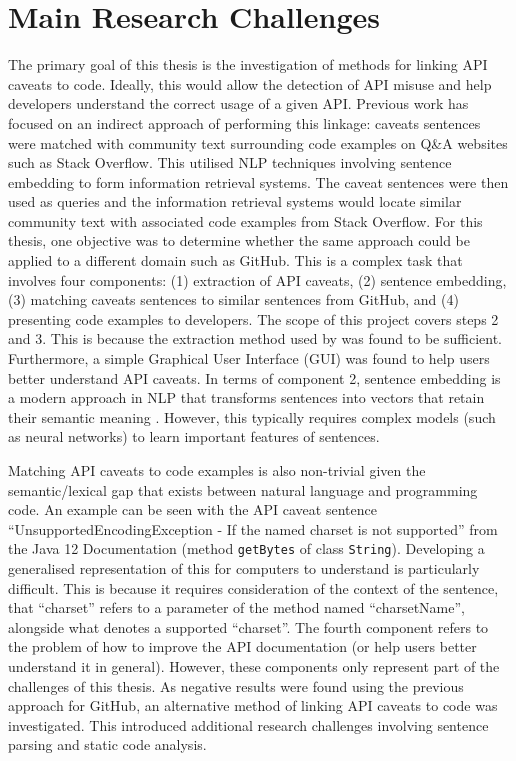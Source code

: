 \section{Main Research Challenges}
\label{sec:mainresearchchallenges}
The primary goal of this thesis is the investigation of methods for linking API caveats to code. Ideally, this would allow the detection of API misuse and help developers understand the correct usage of a given API. Previous work has focused on an indirect approach of performing this linkage: caveats sentences were matched with community text surrounding code examples on Q\&A websites such as Stack Overflow. This utilised NLP techniques involving sentence embedding to form information retrieval systems. The caveat sentences were then used as queries and the information retrieval systems would locate similar community text with associated code examples from Stack Overflow. For this thesis, one objective was to determine whether the same approach could be applied to a different domain such as GitHub. This is a complex task that involves four components: (1) extraction of API caveats, (2) sentence embedding, (3) matching caveats sentences to similar sentences from GitHub, and (4) presenting code examples to developers. The scope of this project covers steps 2 and 3. This is because the extraction method used by \cite{jiamou} was found to be sufficient. Furthermore, a simple Graphical User Interface (GUI) was found to help users better understand API caveats. In terms of component 2, sentence embedding is a modern approach in NLP that transforms sentences into vectors that retain their semantic meaning \cite{palangi2016deep}. However, this typically requires complex models (such as neural networks) to learn important features of sentences. \bigbreak

Matching API caveats to code examples is also non-trivial given the semantic/lexical gap that exists between natural language and programming code. An example can be seen with the API caveat sentence ``UnsupportedEncodingException - If the named charset is not supported'' from the Java 12 Documentation (method \lstinline{getBytes} of class \lstinline{String}). Developing a generalised representation of this for computers to understand is particularly difficult. This is because it requires consideration of the context of the sentence, that ``charset'' refers to a parameter of the method named ``charsetName'', alongside what denotes a supported ``charset''. The fourth component refers to the problem of how to improve the API documentation (or help users better understand it in general). However, these components only represent part of the challenges of this thesis. As negative results were found using the previous approach for GitHub, an alternative method of linking API caveats to code was investigated. This introduced additional research challenges involving sentence parsing and static code analysis.\bigbreak

